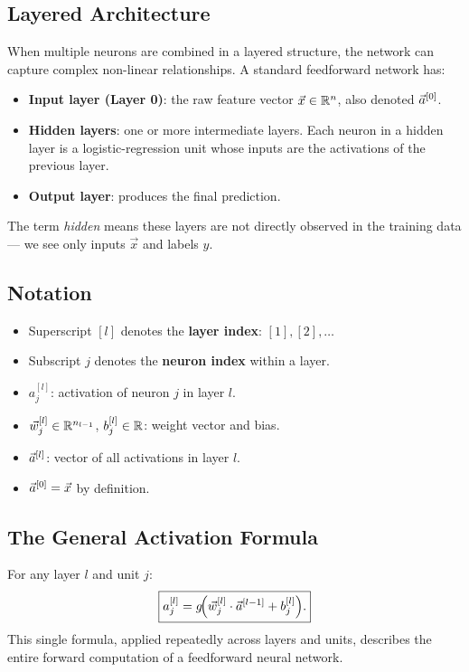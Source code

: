 \subsection{Layered Architecture}

When multiple neurons are combined in a layered structure, the network can
capture complex non-linear relationships. A standard feedforward network has:
\begin{itemize}
\item \textbf{Input layer (Layer 0)}: the raw feature vector
  $\vec{x}\in\mathbb{R}^n$, also denoted $\vec{a}^{[0]}$.
\item \textbf{Hidden layers}: one or more intermediate layers. Each neuron in
  a hidden layer is a logistic-regression unit whose inputs are the activations
  of the previous layer.
\item \textbf{Output layer}: produces the final prediction.
\end{itemize}
The term \textit{hidden} means these layers are not directly observed in the
training data — we see only inputs $\vec{x}$ and labels $y$.

\subsection{Notation}

\begin{itemize}
\item Superscript $[l]$ denotes the \textbf{layer index}: $[1],[2],\ldots$
\item Subscript $j$ denotes the \textbf{neuron index} within a layer.
\item $a_j^{[l]}$: activation of neuron $j$ in layer $l$.
\item $\vec{w}_j^{[l]}\in\mathbb{R}^{n_{l-1}}$, $b_j^{[l]}\in\mathbb{R}$: weight vector and bias.
\item $\vec{a}^{[l]}$: vector of all activations in layer $l$.
\item $\vec{a}^{[0]}=\vec{x}$ by definition.
\end{itemize}

\subsection{The General Activation Formula}

For any layer $l$ and unit $j$:
\begin{equation}
\boxed{a_j^{[l]}=g\!\Bigl(\vec{w}_j^{[l]}\cdot\vec{a}^{[l-1]}+b_j^{[l]}\Bigr).}
\label{eq:activation}
\end{equation}
This single formula, applied repeatedly across layers and units, describes the
entire forward computation of a feedforward neural network.

